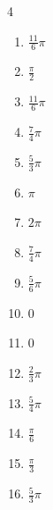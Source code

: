 \begin{multicols}{4}
\begin{enumerate}
  \item $\displaystyle \frac{11}{6}\pi$

  \item $\displaystyle \frac{\pi}{2}$

  \item $\displaystyle \frac{11}{6}\pi$

  \item $\displaystyle \frac{7}{4}\pi$

  \item $\displaystyle \frac{5}{3}\pi$

  \item $\displaystyle \pi$

  \item $\displaystyle 2\pi$

  \item $\displaystyle \frac{7}{4}\pi$

  \item $\displaystyle \frac{5}{6}\pi$

  \item $\displaystyle 0$

  \item $\displaystyle 0$

  \item $\displaystyle \frac{2}{3}\pi$

  \item $\displaystyle \frac{5}{4}\pi$

  \item $\displaystyle \frac{\pi}{6}$

  \item $\displaystyle \frac{\pi}{3}$

  \item $\displaystyle \frac{5}{3}\pi$


\end{enumerate}
\end{multicols}
